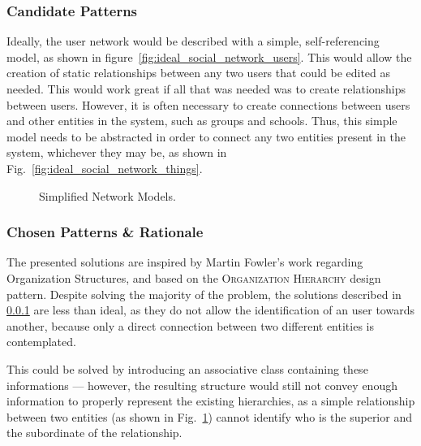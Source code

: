 \subsubsection{Candidate Patterns}\label{sec:fa_social_network_candidate_patterns}

Ideally, the user network would be described with a simple, self-referencing model, as shown in figure~\ref{fig:ideal_social_network_users}. This would allow the creation of static relationships between any two users that could be edited as needed. This would work great if all that was needed was to create relationships between users. However, it is often necessary to create connections between users and other entities in the system, such as groups and schools. Thus, this simple model needs to be abstracted in order to connect any two entities present in the system, whichever they may be, as shown in Fig.~\ref{fig:ideal_social_network_things}.

\begin{figure}[H]
  \centering
  \hspace{20mm}
  \caption{Simplified Network Models.}
  \label{fig:simplified_network_models}
\end{figure}

\subsubsection{Chosen Patterns \& Rationale}\label{sec:fa_social_network_chosen_patterns_rationale}

The presented solutions are inspired by Martin Fowler's work regarding Organization Structures, and based on the \textsc{Organization Hierarchy} design pattern. Despite solving the majority of the problem, the solutions described in \ref{sec:fa_social_network_candidate_patterns} are less than ideal, as they do not allow the identification of an user towards another, because only a direct connection between two different entities is contemplated.

This could be solved by introducing an associative class containing these informations --- however, the resulting structure would still not convey enough information to properly represent the existing hierarchies, as a simple relationship between two entities (as shown in Fig.~\ref{fig:simplified_network_models}) cannot identify who is the superior and the subordinate of the relationship.

